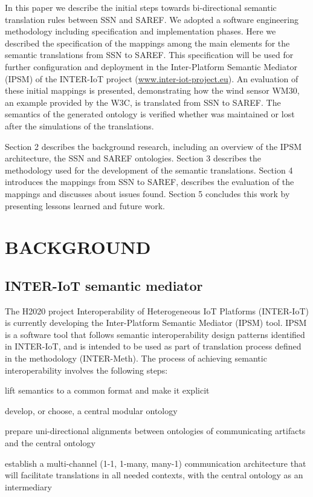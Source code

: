 \documentclass{sig-alternate-05-2015}
\begin{document}
In this paper we describe the initial steps towards bi-directional semantic translation rules between SSN and SAREF. We adopted a software engineering methodology including specification and implementation phases. Here we described the specification of the mappings among the main elements for the semantic translations from SSN to SAREF. This specification will be used for further configuration and deployment in the Inter-Platform Semantic Mediator (IPSM) of the INTER-IoT project (\url{www.inter-iot-project.eu}). An evaluation of these initial mappings is presented, demonstrating how the wind sensor WM30, an example provided by the W3C, is translated from SSN to SAREF. The semantics of the generated ontology is verified whether was maintained or lost after the simulations of the translations. 

Section 2 describes the background research, including an overview of the IPSM architecture, the SSN and SAREF ontologies. Section 3 describes the methodology used for the development of the semantic translations. Section 4 introduces the mappings from SSN to SAREF, describes the evaluation of the mappings and discusses about issues found. Section 5 concludes this work by presenting lessons learned and future work. 

\section{BACKGROUND}

\subsection{INTER-IoT semantic mediator}
The H2020 project Interoperability of Heterogeneous IoT Platforms (INTER-IoT) \cite{Ganzha2016,Ganzha2017a} is currently developing the  Inter-Platform Semantic Mediator (IPSM) tool. IPSM is a software tool that follows semantic interoperability design patterns identified in INTER-IoT, and is intended to be used as part of translation process defined in the methodology (INTER-Meth). The process of achieving semantic interoperability involves the following steps:

\begin{enumerate*}[label=\roman*)]
	\item lift semantics to a common format and make it explicit \cite{Ganzha2017a}
	\item develop, or choose, a central modular ontology
	\item prepare uni-directional alignments between ontologies of communicating artifacts and the central ontology
	\item establish a multi-channel (1-1, 1-many, many-1) communication architecture that will facilitate translations in all needed contexts, with the central ontology as an intermediary
\end{enumerate*}
\end{document}
